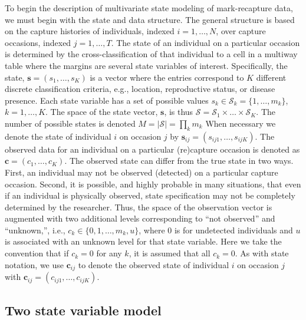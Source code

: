 \documentclass[fleqn]{article}
\newcommand{\bs}{\ensuremath{\mathbf{s}}}
\newcommand{\bc}{\ensuremath{\mathbf{c}}}
\newcommand{\fS}{\ensuremath{\mathcal{S}}}
\begin{document}
To begin the description of multivariate state modeling of mark-recapture data, we must begin with the state and data structure. The general structure is based on the capture histories of individuals, indexed $i=1,\dots,N$, over capture occasions, indexed $j=1,\dots,T$. The state of an individual on a particular occasion is determined by the cross-classification of that individual to a cell in a multiway table where the margins are several state variables of interest. Specifically, the state, $\bs = (s_1,\dots,s_K)$ is a vector where the entries correspond to $K$ different discrete classification criteria, e.g., location, reproductive status, or disease presence. Each state variable has a set of possible values $s_k \in \fS_k=\{1,\dots,m_k\}$, $k=1,\dots,K$. The space of the state vector, $\bs$, is thus $\fS = \fS_1 \times \dots \times \fS_K$. The number of possible states is denoted $M = |\fS|=\prod_k m_k$ When necessary we denote the state of individual $i$ on occasion $j$ by $\bs_{ij}=(s_{ij1},\dots,s_{ijK})$. The observed data for an individual on a particular (re)capture occasion is denoted as $\bc = (c_1,\dots,c_K)$. The observed state can differ from the true state in two ways. First, an individual may not be observed (detected) on a particular capture occasion. Second, it is possible, and highly probable in many situations, that even if an individual is physically observed, state specification may not be completely determined by the researcher. Thus, the space of the observation vector is augmented with two additional levels corresponding to ``not observed'' and ``unknown,'', i.e., $c_k \in \{0,1,\dots,m_k,u\}$, where 0 is for undetected individuals and $u$ is associated with an unknown level for that state variable. Here we take the convention that if $c_k=0$ for any $k$, it is assumed that all $c_k=0$. As with state notation, we use $\bc_{ij}$ to denote the observed state of individual $i$ on occasion $j$ with $\bc_{ij}=(c_{ij1},\dots,c_{ijK})$.


\subsection{Two state variable model}
\end{document}
